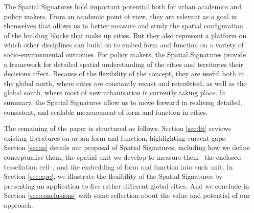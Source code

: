 The Spatial Signatures hold important potential both for urban academics and
policy makers.
From an academic point of view, they are relevant as a goal in themselves
that allows us to better measure and study the spatial configuration of the
building blocks that make up cities. But they also represent a platform on
which other disciplines can build on to embed form and function on a variety
of socio-environmental outcomes.
For policy makers, the Spatial Signatures provide a framework for detailed
spatial understanding of the cities and territories their decisions affect.
Because of the flexibility of the concept, they are useful both in the global
north, where cities are constantly recast and retrofitted, as well as the
global south, where most of new urbanisation is currently taking place.
%
In summary, the Spatial Signatures allow us to move forward in realising
detailed, consistent, and scalable measurement of form and function in
cities.

The remaining of the paper is structured as follows. Section \ref{sec:lit}
reviews existing literatures on urban form and function, highlighting current
gaps. Section \ref{sec:ss} details our proposal of Spatial Signatures,
including how we define conceptualise them, the spatial unit we develop to
measure them --the enclosed tessellation cell--, and the embedding of form and
function into such unit. In Section \ref{sec:app}, we illustrate the
flexibility of the Spatial Signatures by presenting an application to five
rather different global cities. And we conclude in Section
\ref{sec:conclusions} with some reflection about the value and potential of
our approach.










